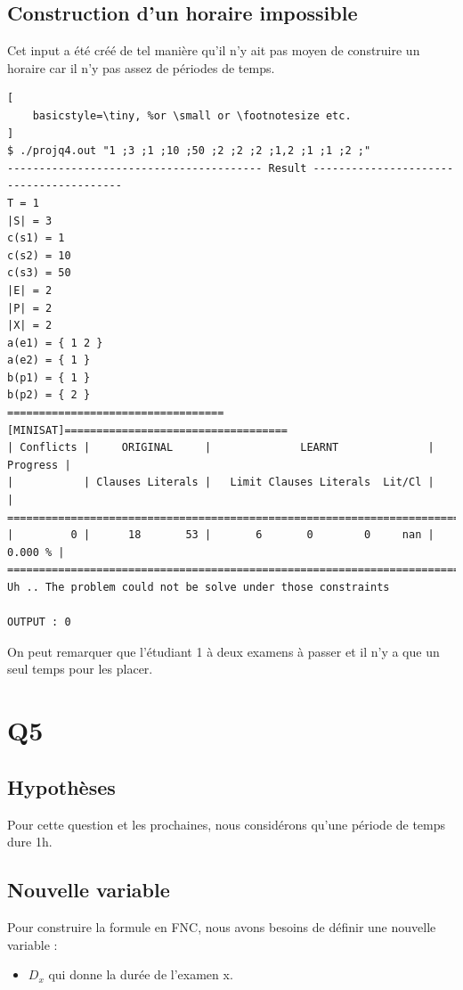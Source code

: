 \documentclass[a4paper,11pt]{article}
\begin{document}
\subsection{Construction d'un horaire impossible}
Cet input a été créé de tel manière qu'il n'y ait pas moyen de construire un horaire car il n'y pas assez de périodes de temps.
\begin{lstlisting}[
    basicstyle=\tiny, %or \small or \footnotesize etc.
]
$ ./projq4.out "1 ;3 ;1 ;10 ;50 ;2 ;2 ;2 ;1,2 ;1 ;1 ;2 ;"
---------------------------------------- Result ----------------------------------------
T = 1
|S| = 3
c(s1) = 1
c(s2) = 10
c(s3) = 50
|E| = 2
|P| = 2
|X| = 2
a(e1) = { 1 2 }
a(e2) = { 1 }
b(p1) = { 1 }
b(p2) = { 2 }
==================================[MINISAT]===================================
| Conflicts |     ORIGINAL     |              LEARNT              | Progress |
|           | Clauses Literals |   Limit Clauses Literals  Lit/Cl |          |
==============================================================================
|         0 |      18       53 |       6       0        0     nan |  0.000 % |
==============================================================================
Uh .. The problem could not be solve under those constraints

OUTPUT : 0
\end{lstlisting}
On peut remarquer que l'étudiant 1 à deux examens à passer et il n'y a que un seul temps pour les placer.

\section{Q5}

\subsection{Hypothèses}
Pour cette question et les prochaines, nous considérons qu'une période de temps dure 1h.

\subsection{Nouvelle variable}

Pour construire la formule en FNC, nous avons besoins de définir une nouvelle variable :  
\begin{itemize}
	\item \( D_{x}\) qui donne la durée de l'examen x.
\end{itemize}
\end{document}
